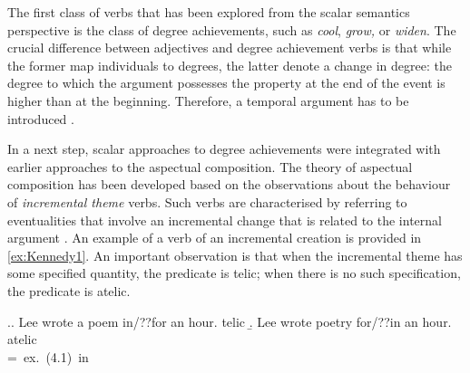 The first class of verbs that has been explored from the scalar semantics perspective is the class of degree achievements, such as \textit{cool}, \textit{grow,} or \textit{widen}. The crucial difference between adjectives and degree achievement verbs is that while the former map individuals to degrees, the latter denote a change in degree: the degree to which the argument possesses the property at the end of the event is higher than at the beginning. Therefore, a temporal argument has to be introduced \citep{Hay:99, KennedyLevin:02}.


In a next step, scalar approaches to degree achievements were integrated with earlier approaches to the aspectual composition. The theory of aspectual composition has been developed based on the observations about the behaviour of \textit{incremental theme} verbs. Such verbs are characterised by referring to eventualities that involve an incremental change that is related to the internal argument \citep[see][]{Garey:57, Wierzbicka:67, Verkuyl:72, Krifka:86, Krifka:92, Filip:92, Filip:99}. An example of a verb of an incremental creation is provided in \ref{ex:Kennedy1}. An important observation is that when the incremental theme has some specified quantity, the predicate is telic; when there is no such specification, the predicate is atelic.


\ex.\label{ex:Kennedy1}\a. Lee wrote a poem in/??for an hour. \hfill telic
\b. Lee wrote poetry for/??in an hour. \hfill atelic\\
\hbox{}\hfill\hbox{= ex.~(4.1) in \citealt[103]{Kennedy:12}}


%

